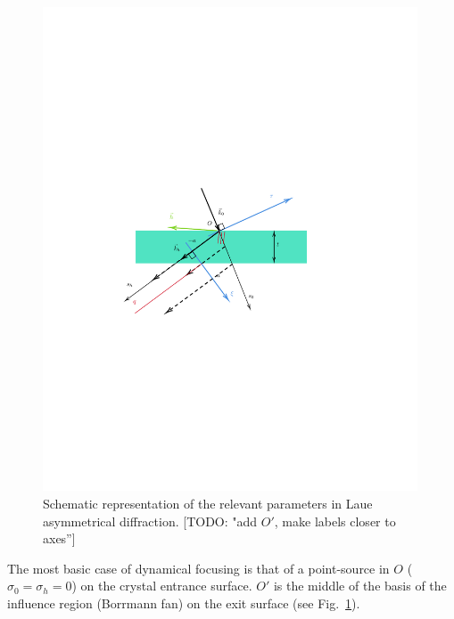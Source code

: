 \documentclass[preprint]{iucr}              %
\newcommand{\todo}[1]{{\color{red}[TODO: "#1'']}}
\newcommand{\inred}[1]{{\color{red}#1}}
\begin{document}
\begin{figure}
\label{fig:laue}
\caption{Schematic representation of the relevant parameters in Laue asymmetrical diffraction. \todo{add $O'$, make labels closer to axes}
}
\includegraphics[width=0.99\textwidth,trim=3cm 10cm 5cm 10cm,clip=true]{fig3.pdf}
\end{figure}


\inred{The most basic case of dynamical focusing is that of a point-source in $O$ ($\sigma_0=\sigma_h=0$)} on the crystal entrance surface.
\inred{$O'$ is the middle of the basis of the influence region (Borrmann fan) on the exit surface (see Fig.~\ref{fig:laue}).}
\end{document}
